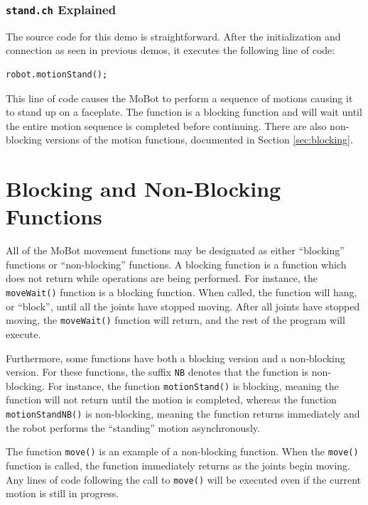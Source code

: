 \documentclass{article}
\begin{document}
\subsubsection{\texttt{stand.ch} Explained}
The source code for this demo is straightforward. After the initialization and 
connection as seen in previous demos, it executes the following line of
code:
\begin{verbatim}
robot.motionStand();
\end{verbatim}
This line of code causes the MoBot to perform a sequence of motions causing it to
stand up on a faceplate. The function is a blocking function and will wait until
the entire motion sequence is completed before continuing. There are also non-blocking
versions of the motion functions, documented in Section \ref{sec:blocking}.

\section{\label{sec:blocking}Blocking and Non-Blocking Functions}
All of the MoBot movement functions may be designated as either ``blocking'' 
functions or ``non-blocking'' functions. A blocking function is a function which
does not return while operations are being performed. For instance, the
\texttt{moveWait()} function is a blocking function. When called, the function
will hang, or ``block'', until all the joints have stopped moving. After all
joints have stopped moving, the \texttt{moveWait()} function will return, and 
the rest of the program will execute.

Furthermore, some functions have both a blocking version and a non-blocking
version. For these functions, the suffix \texttt{NB} denotes that the function
is non-blocking. For instance, the function \texttt{motionStand()} is blocking,
meaning the function will not return until the motion is completed, whereas
the function \texttt{motionStandNB()} is non-blocking, meaning the function
returns immediately and the robot performs the ``standing'' motion
asynchronously.

The function \texttt{move()} is an example of a non-blocking function. When
the \texttt{move()} function is called, the function immediately returns 
as the joints begin moving. Any lines of code following the call to 
\texttt{move()} will be executed even if the current motion is still in
progress. 
\end{document}
